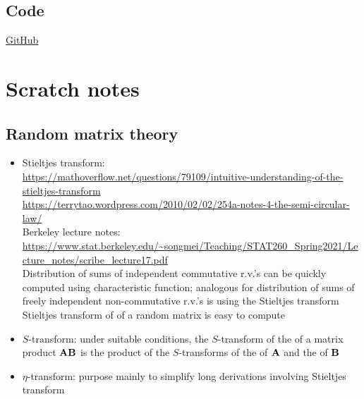 \documentclass[10pt]{article}
\begin{document}
\subsection{Code}

\href{https://github.com/jonathanlctt/ihs_srht}{GitHub}


\newpage


\section{Scratch notes}

\subsection{Random matrix theory}

\begin{itemize}

\item
Stieltjes transform: \\
\url{https://mathoverflow.net/questions/79109/intuitive-understanding-of-the-stieltjes-transform} \\
\url{https://terrytao.wordpress.com/2010/02/02/254a-notes-4-the-semi-circular-law/} \\
Berkeley lecture notes: \url{https://www.stat.berkeley.edu/~songmei/Teaching/STAT260_Spring2021/Lecture_notes/scribe_lecture17.pdf} \\
Distribution of sums of independent commutative r.v.'s can be quickly computed using characteristic function; analogous for distribution of sums of freely independent non-commutative r.v.'s is using the Stieltjes transform \\
Stieltjes transform of \esd of a random matrix is easy to compute \citep{Couillet:2011}

\item
$S$-transform: under suitable conditions, the $S$-transform of the \lsd of a matrix product $\mathbf{A}\mathbf{B}$ is the product of the $S$-transforms of the \lsd of $\mathbf{A}$ and the \lsd of $\mathbf{B}$ \citep{Couillet:2011}

\item
$\eta$-transform: purpose mainly to simplify long derivations involving Stieltjes transform \citep{Couillet:2011}


\end{itemize}
\end{document}
